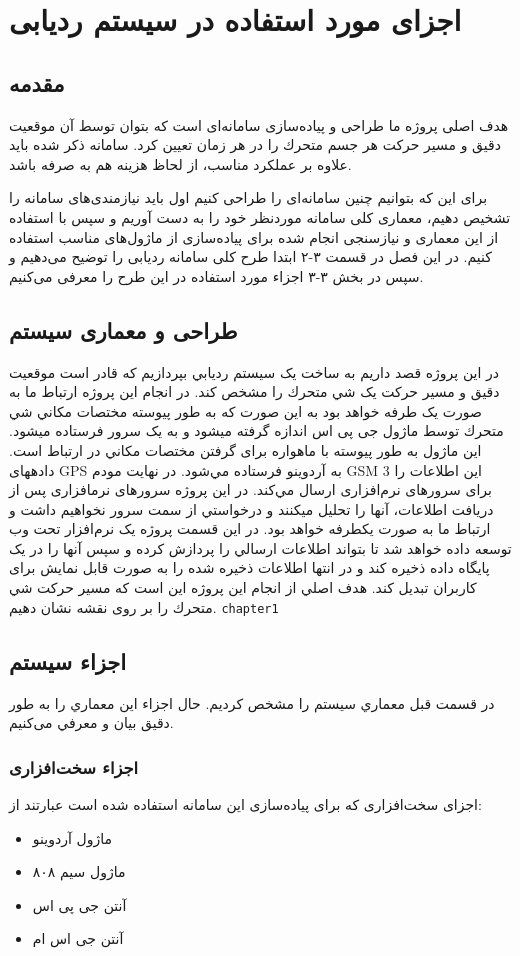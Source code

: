 \chapter{اجزای مورد استفاده در سیستم ردیابی}

\section{مقدمه}
هدف اصلی پروژه ما طراحی و پياده‌سازی سامانه‌ای است كه بتوان توسط آن موقعيت دقيق و مسير
حركت هر جسم متحرك را در هر زمان تعيين كرد. سامانه ذکر شده باید علاوه بر عملکرد مناسب، از لحاظ هزینه هم به صرفه باشد.


برای این که بتوانیم چنین سامانه‌ای را طراحی کنیم اول باید نیازمندی‌های سامانه را تشخیص دهیم، معماری کلی سامانه موردنظر خود را به دست آوریم و سپس با استفاده از این معماری و نیازسنجی انجام شده برای پیاده‌سازی از ماژول‌های مناسب استفاده کنیم. در این فصل در قسمت ۳-۲ ابتدا طرح کلی سامانه ردیابی را توضیح می‌دهیم و سپس در بخش ۳-۳ اجزاء مورد استفاده در این طرح را معرفی می‌کنیم.
\section{طراحی و معماری سیستم}
در اين پروژه قصد داريم به ساخت يک سيستم رديابي بپردازيم كه قادر است موقعيت دقيق و مسير حركت يک شي متحرك را مشخص كند. در انجام اين پروژه ارتباط ما به صورت يک طرفه خواهد بود به اين صورت كه به طور پيوسته مختصات مکاني شي متحرك توسط ماژول
 جی پی اس
  اندازه گرفته ميشود و به يک سرور فرستاده ميشود. اين ماژول به طور پيوسته با ماهواره برای گرفتن مختصات مکاني در ارتباط است. دادههای GPS به آردوينو فرستاده مي‌شود. در نهايت مودم GSM 3 اين اطلاعات را برای سرورهای
نرم‌افزاری ارسال مي‌كند. در اين پروژه سرورهای نرمافزاری پس از دريافت اطلاعات، آنها را تحليل ميكنند و درخواستي از سمت سرور نخواهيم داشت و ارتباط ما به صورت يکطرفه خواهد بود. در اين قسمت پروژه يک نرم‌افزار تحت وب توسعه داده خواهد شد تا
بتواند اطلاعات ارسالي را پردازش كرده و سپس آنها را در يک پايگاه داده ذخيره كند و در انتها اطلاعات ذخيره شده را به صورت قابل نمايش برای كاربران تبديل كند. هدف اصلي از انجام اين پروژه اين است كه مسير حركت شي متحرك را بر روی نقشه نشان
دهيم.
\verb;chapter1;
\section{اجزاء سیستم}
در قسمت قبل معماري سيستم را مشخص كرديم. حال اجزاء اين معماري را به طور دقيق بيان و معرفي می‌کنیم.
\subsection{اجزاء سخت‌افزاری}
اجزای سخت‌افزاری که برای پیاده‌سازی این سامانه استفاده شده است عبارتند از:
\begin{itemize}
	\item
	ماژول آردوینو
	\item
ماژول سیم ۸۰۸
	\item
	آنتن جی پی اس
	\item
	آنتن جی اس ام
\end{itemize}
